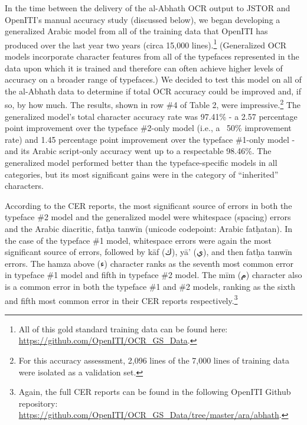 In the time between the delivery of the al-Abhath OCR output to JSTOR and
OpenITI’s manual accuracy study (discussed below), we began developing a
generalized Arabic model from all of the training data that OpenITI has
produced over the last year two years (circa 15,000 lines).\footnote{All of
this gold standard training data can be found here:
\url{https://github.com/OpenITI/OCR_GS_Data}.} (Generalized OCR models
incorporate character features from all of the typefaces represented in the
data upon which it is trained and therefore can often achieve higher levels of
accuracy on a broader range of typefaces.) We decided to test this model on all
of the al-Abhath data to determine if total OCR accuracy could be improved and,
if so, by how much. The results, shown in row \#4 of Table 2, were
impressive.\footnote{For this accuracy assessment, 2,096 lines of the 7,000
lines of training data were isolated as a validation set.} The generalized
model’s  total character accuracy rate was 97.41\% - a 2.57 percentage point
improvement over the typeface \#2-only model (i.e., a ~50\% improvement rate)
and 1.45 percentage point improvement over the typeface \#1-only model - and
its Arabic script-only accuracy went up to a respectable 98.46\%. The
generalized model performed better than the typeface-specific models in all
categories, but its most significant gains were in the category of “inherited”
characters.


According to the CER reports, the most significant source of errors in both the
typeface \#2 model and the generalized model were whitespace (spacing) errors
and the Arabic diacritic, fatḥa tanwīn (unicode codepoint: Arabic fatḥatan). In
the case of the typeface \#1 model, whitespace errors were again the most
significant source of errors, followed by kāf (ك), yā’ (ي), and then fatḥa
tanwīn errors. The hamza above (ء) character ranks as the seventh most common
error in typeface \#1 model and fifth in typeface \#2 model. The mīm (م)
character also is a common error in both the typeface \#1 and \#2 models, ranking
as the sixth and fifth most common error in their CER reports
respectively.\footnote{ Again, the full CER reports can be found in the
following OpenITI Github repository:
\url{https://github.com/OpenITI/OCR_GS_Data/tree/master/ara/abhath}.}

